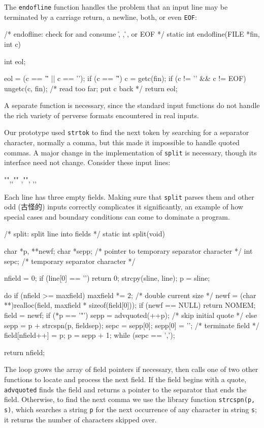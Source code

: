 The \verb'endofline' function handles the problem that an input line may be
terminated by a carriage return, a newline, both, or even \verb'EOF':
\begin{wellcode}
    /* endofline: check for and consume \r, \n, \r\n, or EOF */
    static int endofline(FILE *fin, int c)
    {
        int eol;

        eol = (c == '\r' || c == '\n');
        if (c == '\r') {
            c = getc(fin);
            if (c != '\n' && c != EOF)
                ungetc(c, fin); /* read too far; put c back */
        }
        return eol;
    }
\end{wellcode}
A separate function is necessary, since the standard input functions do not
handle the rich variety of perverse formats encountered in real inputs.

Our prototype used \verb'strtok' to find the next token by searching for a
separator character, normally a comma, but this made it impossible to
handle quoted commas.  A major change in the implementation of \verb'split'
is necessary, though its interface need not change. Consider these input
lines:
\begin{wellcode}
    "",,""
    ,"",
    ,,
\end{wellcode}

Each line has three empty fields. Making sure that \verb'split' parses them
and other odd (古怪的) inputs correctly complicates it significantly, an
example of how special cases and boundary conditions can come to dominate a
program.
\begin{wellcode}
    /* split: split line into fields */
    static int split(void)
    {
        char    *p, **newf;
        char    *sepp;  /* pointer to temporary separator character */
        int     sepc;   /* temporary separator character */

        nfield = 0;
        if (line[0] == '\0')
            return 0;
        strcpy(sline, line);
        p = sline;

        do {
            if (nfield >= maxfield) {
                maxfield *= 2;  /* double current size */
                newf = (char **)realloc(field,
                        maxfield * sizeof(field[0]));
                if (newf == NULL)
                    return NOMEM;
                field = newf;
            }
            if (*p == '"')
                sepp = advquoted(++p);  /* skip initial quote */
            else
                sepp = p + strcspn(p, fieldsep);
            sepc = sepp[0];
            sepp[0] = '\0'; /* terminate field */
            field[nfield++] = p;
            p = sepp + 1;
        } while (sepc == ',');

        return nfield;
    }
\end{wellcode}
The loop grows the array of field pointers if necessary, then calls one of
two other functions to locate and process the next field. If the field
begins with a quote, \verb'advquoted' finds the field and returns a pointer
to the separator that ends the field.  Otherwise, to find the next comma we
use the library function \verb'strcspn(p, s)', which searches a string
\verb'p' for the next occurrence of any character in string \verb's'; it
returns the number of characters skipped over.

